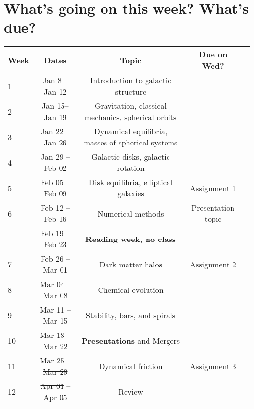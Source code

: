 \documentclass{article}
\begin{document}
\section*{What's going on this week? What's due?}

\begin{table}[H]
\begin{center}
\begin{tabular}{lcccc}
Week & Dates &  \quad Topic & \quad Due on Wed? & \\
\hline
\hline
1 & Jan 8 -- Jan 12 & Introduction to galactic structure & \\
2 & Jan 15-- Jan 19 & Gravitation, classical mechanics, spherical orbits &  \\ 
3 & Jan 22 -- Jan 26 & Dynamical equilibria, masses of spherical systems &  \\
4 & Jan 29 -- Feb 02 & Galactic disks, galactic rotation &  \\
5 & Feb 05 -- Feb 09 & Disk equilibria, elliptical galaxies &  Assignment 1 \\
6 & Feb 12 -- Feb 16 & Numerical methods & Presentation topic  \\ 
 & Feb 19 -- Feb 23  & {\bf Reading week, no class}&  \\
7 & Feb 26 -- Mar 01 & Dark matter halos & Assignment 2  \\
8 & Mar 04 -- Mar 08 & Chemical evolution &  \\
9 & Mar 11 -- Mar 15 & Stability, bars, and spirals & \\
10 & Mar 18 -- Mar 22 & {\bf Presentations} and Mergers &  \\ 
11 & Mar 25 -- \sout{Mar 29} & Dynamical friction & Assignment 3 \\
12 & \sout{Apr 01} -- Apr 05 & Review &   
\end{tabular}
\end{center}
\end{table}
\end{document}
